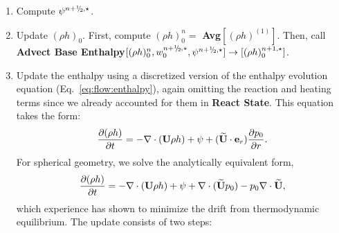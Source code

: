 \begin{description}
\begin{enumerate}
\item Compute $\psi^{\nph,\star}$.

\item Update $(\rho h)_0$.  First, compute $(\rho h)_0^n = $ {\bf Avg}$[(\rho h)^{(1)}]$.
Then, call\\
{\bf Advect Base Enthalpy}$[(\rho h)_0^{n}, w_0^{\nph,\star}, \psi^{\nph,\star}] \rightarrow [(\rho h)_0^{n+1,\star}]$.

\item Update the enthalpy using a discretized version of the enthalpy
evolution equation (Eq.~\ref{eq:flow:enthalpy}), again omitting the reaction and heating terms
since we already accounted for
them in {\bf React State}.  This equation takes the form:
\begin{equation}
\frac{\partial (\rho h)}{\partial t}  = - \nabla \cdot ({\bf U} \rho h) + \psi + (\widetilde{{\bf U}} \cdot {\bf e}_r) \frac{\partial p_0}{\partial r}.
\end{equation}
For spherical geometry, we solve the
analytically equivalent form,
\begin{equation}
\frac{\partial (\rho h)}{\partial t}  = - \nabla \cdot ({\bf U} \rho h) + \psi + \nabla \cdot (\widetilde{{\bf U}} p_0) - p_0 \nabla \cdot \widetilde{{\bf U}},
\end{equation}
which experience has shown to minimize the drift from thermodynamic
equilibrium.  The update consists of two steps:


\end{enumerate}
\end{description}
